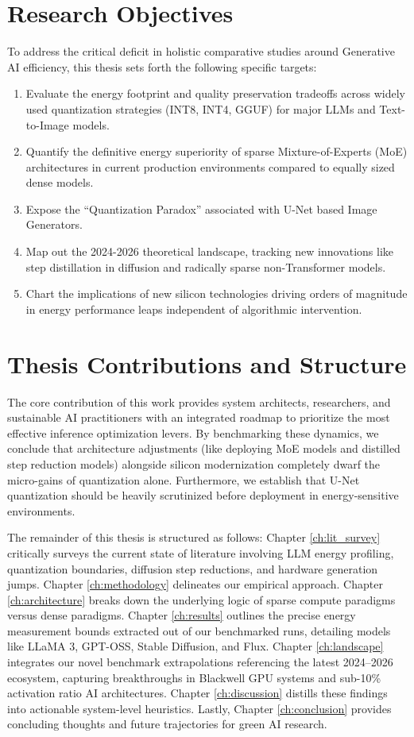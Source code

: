\documentclass[12pt, a4paper]{report}
\begin{document}
\section{Research Objectives}
To address the critical deficit in holistic comparative studies around Generative AI efficiency, this thesis sets forth the following specific targets:
\begin{enumerate}
    \item Evaluate the energy footprint and quality preservation tradeoffs across widely used quantization strategies (INT8, INT4, GGUF) for major LLMs and Text-to-Image models.
    \item Quantify the definitive energy superiority of sparse Mixture-of-Experts (MoE) architectures in current production environments compared to equally sized dense models.
    \item Expose the ``Quantization Paradox'' associated with U-Net based Image Generators.
    \item Map out the 2024-2026 theoretical landscape, tracking new innovations like step distillation in diffusion and radically sparse non-Transformer models.
    \item Chart the implications of new silicon technologies driving orders of magnitude in energy performance leaps independent of algorithmic intervention.
\end{enumerate}

\section{Thesis Contributions and Structure}
The core contribution of this work provides system architects, researchers, and sustainable AI practitioners with an integrated roadmap to prioritize the most effective inference optimization levers. By benchmarking these dynamics, we conclude that architecture adjustments (like deploying MoE models and distilled step reduction models) alongside silicon modernization completely dwarf the micro-gains of quantization alone. Furthermore, we establish that U-Net quantization should be heavily scrutinized before deployment in energy-sensitive environments.

The remainder of this thesis is structured as follows: Chapter \ref{ch:lit_survey} critically surveys the current state of literature involving LLM energy profiling, quantization boundaries, diffusion step reductions, and hardware generation jumps. Chapter \ref{ch:methodology} delineates our empirical approach. Chapter \ref{ch:architecture} breaks down the underlying logic of sparse compute paradigms versus dense paradigms. Chapter \ref{ch:results} outlines the precise energy measurement bounds extracted out of our benchmarked runs, detailing models like LLaMA 3, GPT-OSS, Stable Diffusion, and Flux. Chapter \ref{ch:landscape} integrates our novel benchmark extrapolations referencing the latest 2024–2026 ecosystem, capturing breakthroughs in Blackwell GPU systems and sub-10\% activation ratio AI architectures. Chapter \ref{ch:discussion} distills these findings into actionable system-level heuristics. Lastly, Chapter \ref{ch:conclusion} provides concluding thoughts and future trajectories for green AI research.
\end{document}
